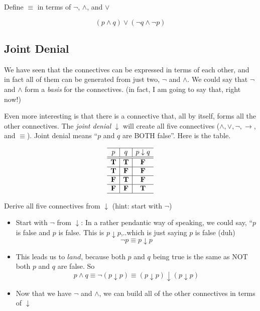 \begin{problem}
Define $\equiv$ in terms of $\neg$, $\land$, and $\lor$

\ifKey
\color{red}
\hfill \begin{minipage}{0.5\textwidth}
$$ (p \land q )\lor (\neg q \land \neg p)$$
\end{minipage}
\color{black}
\fi
\end{problem}

\newpage
\subsection*{Joint Denial}
We have seen that the connectives can be expressed in terms of each other, and in fact all of them can be generated from just two, $\neg$ and $\land$.  We could say that $\neg$ and $\land$ form a \emph{basis} for the connectives.  (in fact, I am going to say that, right now!)

Even more interesting is that there is a connective that, all by itself, forms all the other connectives.  The \emph{joint denial} $\downarrow$ will create all five connectives ($\land, \lor, \neg, \rightarrow$, and $\equiv$).  Joint denial means ``$p$ and $q$ are BOTH false''.  Here is the table.

\[  \begin{array}{c|c|c}
  \hline  
  p & q & p\downarrow q\\
  \hline
  \hline
 \mathbf{T} &  \mathbf{T} &  \mathbf{F}\\
  \hline
 \mathbf{T} &  \mathbf{F} &  \mathbf{F}\\
  \hline
 \mathbf{F} &  \mathbf{T} &  \mathbf{F}\\
  \hline
 \mathbf{F} &  \mathbf{F} &  \mathbf{T}\\
    \hline
    \end{array}\]
    
\begin{problem}Derive all five connectives from $\downarrow$ (hint: start with $\neg$)

\ifKey
\color{red}
\hfill \begin{minipage}{0.5\textwidth}
\begin{itemize}
\item Start with $\neg$ from $\downarrow$:  In a rather pendantic way of speaking, we could say, ``$p$ is false and $p$ is false.  This is $p\downarrow p$,..which is just saying $p$ is false (duh) 
$$\neg p \equiv p\downarrow p $$
\item This leads us to $land$, because both $p$ and $q$ being true is the same as NOT both $p$ and $q$ are false.  So 
$$ p\land q \equiv \neg (p\downarrow p) \equiv (p\downarrow p) \downarrow  (p\downarrow p)$$
\item Now that we have $\neg$ and $\land$, we can build all of the other connectives in terms of $\downarrow$ 
\end{itemize}
\end{minipage}
\color{black}
\fi


\end{problem}

